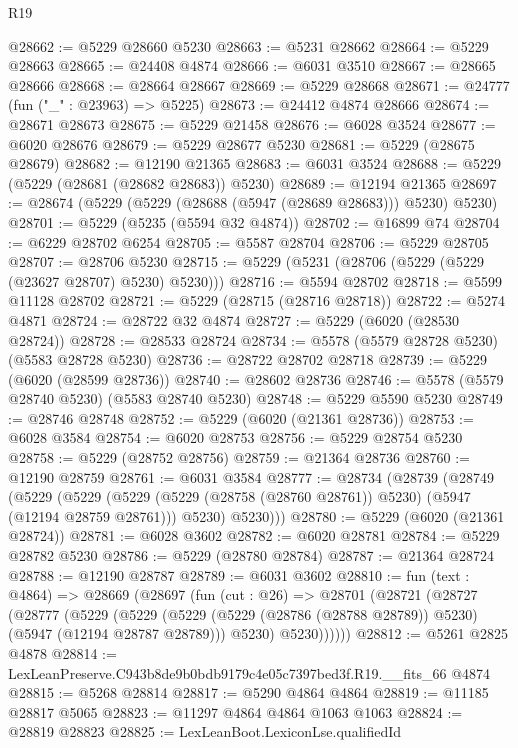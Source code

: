 \begin{lexlean}{R19}
\begin{coremodule}
@28662 := @5229 @28660 @5230
@28663 := @5231 @28662
@28664 := @5229 @28663
@28665 := @24408 @4874
@28666 := @6031 @3510
@28667 := @28665 @28666
@28668 := @28664 @28667
@28669 := @5229 @28668
@28671 := @24777 (fun ("_" : @23963) => @5225)
@28673 := @24412 @4874 @28666
@28674 := @28671 @28673
@28675 := @5229 @21458
@28676 := @6028 @3524
@28677 := @6020 @28676
@28679 := @5229 @28677 @5230
@28681 := @5229 (@28675 @28679)
@28682 := @12190 @21365
@28683 := @6031 @3524
@28688 := @5229 (@5229 (@28681 (@28682 @28683)) @5230)
@28689 := @12194 @21365
@28697 := @28674 (@5229 (@5229 (@28688 (@5947 (@28689 @28683))) @5230) @5230)
@28701 := @5229 (@5235 (@5594 @32 @4874))
@28702 := @16899 @74
@28704 := @6229 @28702 @6254
@28705 := @5587 @28704
@28706 := @5229 @28705
@28707 := @28706 @5230
@28715 := @5229 (@5231 (@28706 (@5229 (@5229 (@23627 @28707) @5230) @5230)))
@28716 := @5594 @28702
@28718 := @5599 @11128 @28702
@28721 := @5229 (@28715 (@28716 @28718))
@28722 := @5274 @4871
@28724 := @28722 @32 @4874
@28727 := @5229 (@6020 (@28530 @28724))
@28728 := @28533 @28724
@28734 := @5578 (@5579 @28728 @5230) (@5583 @28728 @5230)
@28736 := @28722 @28702 @28718
@28739 := @5229 (@6020 (@28599 @28736))
@28740 := @28602 @28736
@28746 := @5578 (@5579 @28740 @5230) (@5583 @28740 @5230)
@28748 := @5229 @5590 @5230
@28749 := @28746 @28748
@28752 := @5229 (@6020 (@21361 @28736))
@28753 := @6028 @3584
@28754 := @6020 @28753
@28756 := @5229 @28754 @5230
@28758 := @5229 (@28752 @28756)
@28759 := @21364 @28736
@28760 := @12190 @28759
@28761 := @6031 @3584
@28777 := @28734
    (@28739
      (@28749
        (@5229
          (@5229
            (@5229 (@5229 (@28758 (@28760 @28761)) @5230) (@5947 (@12194 @28759 @28761)))
            @5230)
          @5230)))
@28780 := @5229 (@6020 (@21361 @28724))
@28781 := @6028 @3602
@28782 := @6020 @28781
@28784 := @5229 @28782 @5230
@28786 := @5229 (@28780 @28784)
@28787 := @21364 @28724
@28788 := @12190 @28787
@28789 := @6031 @3602
@28810 := fun (text : @4864) =>
  @28669
    (@28697
      (fun (cut : @26) =>
      @28701
        (@28721
          (@28727
            (@28777
              (@5229
                (@5229
                  (@5229 (@5229 (@28786 (@28788 @28789)) @5230) (@5947 (@12194 @28787 @28789)))
                  @5230)
                @5230))))))
@28812 := @5261 @2825 @4878
@28814 := LexLeanPreserve.C943b8de9b0bdb9179c4e05c7397bed3f.R19.__fits_66 @4874
@28815 := @5268 @28814
@28817 := @5290 @4864 @4864
@28819 := @11185 @28817 @5065
@28823 := @11297 @4864 @4864 @1063 @1063
@28824 := @28819 @28823
@28825 := LexLeanBoot.LexiconLse.qualifiedId

\end{coremodule}
\end{lexlean}
